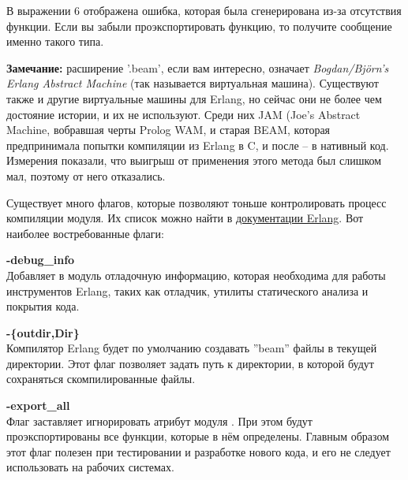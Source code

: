 В выражении 6 отображена ошибка, которая была сгенерирована из\--за отсутствия функции.
Если вы забыли проэкспортировать функцию, то получите сообщение именно такого типа.\\ 
\colorbox{lgray}
{
    \begin{minipage}{1\linewidth}
        \textbf{Замечание:} расширение '.beam', если вам интересно, означает \emph{Bogdan/Björn's Erlang Abstract Machine} (так называется виртуальная машина).
        Существуют также и другие виртуальные машины для Erlang, но сейчас они не более чем достояние истории, и их не используют.
        Среди них JAM (Joe's Abstract Machine, вобравшая черты Prolog WAM, и старая BEAM, которая предпринимала попытки компиляции из Erlang в C, и после \--- в нативный код.
        Измерения показали, что выигрыш от применения этого метода был слишком мал, поэтому от него отказались.
    \end{minipage}
}

Существует много флагов, которые позволяют тоньше контролировать процесс компиляции модуля.
Их список можно найти в \href{http://erlang.org/doc/man/compile.html}{документации Erlang}.
Вот наиболее востребованные флаги:\\ 

\begin{minipage}{0.9\linewidth}
    \textbf{-debug\_info}\\ 
    Добавляет в модуль отладочную информацию, которая необходима для работы инструментов Erlang, таких как отладчик, утилиты статического анализа и покрытия кода.
\end{minipage}

\begin{minipage}{0.9\linewidth}
    \textbf{-\{outdir,Dir\}}\\ 
    Компилятор Erlang будет по умолчанию создавать ''beam'' файлы в текущей директории.
    Этот флаг позволяет задать путь к директории, в которой будут сохраняться скомпилированные файлы.
\end{minipage}

\begin{minipage}{0.9\linewidth}
    \textbf{-export\_all}\\ 
    Флаг заставляет игнорировать атрибут модуля .
    При этом будут проэкспортированы все функции, которые в нём определены.
    Главным образом этот флаг полезен при тестировании и разработке нового кода, и его не следует использовать на рабочих системах.
\end{minipage}

